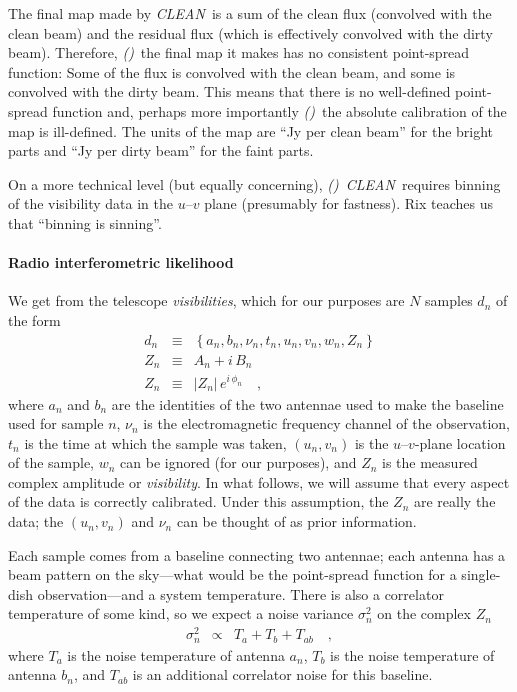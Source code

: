 \documentclass[12pt]{article}
\newcounter{hogg}
\newcommand{\hoggitem}{\textsl{(\thehogg)}\stepcounter{hogg}}
\newcommand{\project}[1]{\textsl{#1}}
\newcommand{\CLEAN}{\project{CLEAN}}
\renewcommand{\exp}[1]{e^{#1}}
\newcommand{\set}[1]{\left\{{#1}\right\}}
\begin{document}
The final map made by \CLEAN\ is a sum of the clean flux (convolved
with the clean beam) and the residual flux (which is effectively
convolved with the dirty beam).  Therefore, \hoggitem~the final map it
makes has no consistent point-spread function: Some of the flux is
convolved with the clean beam, and some is convolved with the dirty
beam.  This means that there is no well-defined point-spread function
and, perhaps more importantly \hoggitem~the absolute calibration of
the map is ill-defined.  The units of the map are ``Jy per clean
beam'' for the bright parts and ``Jy per dirty beam'' for the faint
parts.

On a more technical level (but equally concerning), \hoggitem~\CLEAN\ 
requires binning of the visibility data in the $u$--$v$ plane
(presumably for fastness).  Rix teaches us that ``binning is
sinning''.

\paragraph{Radio interferometric likelihood}

We get from the telescope \emph{visibilities}, which for our purposes
are $N$ samples $d_n$ of the form
\begin{eqnarray}
d_n &\equiv& \set{a_n, b_n, \nu_n, t_n, u_n, v_n, w_n, Z_n}
\\
Z_n &\equiv& A_n + i\,B_n
\\
Z_n &\equiv& \left|Z_n\right|\,\exp{i\,\phi_n}
\quad,
\end{eqnarray}
where $a_n$ and $b_n$ are the identities of the two antennae used to
make the baseline used for sample $n$, $\nu_n$ is the electromagnetic
frequency channel of the observation, $t_n$ is the time at which the
sample was taken, $(u_n, v_n)$ is the $u$--$v$-plane location of the
sample, $w_n$ can be ignored (for our purposes), and $Z_n$ is the
measured complex amplitude or \emph{visibility}.  In what follows, we
will assume that every aspect of the data is correctly calibrated.
Under this assumption, the $Z_n$ are really the data; the $(u_n,
v_n)$ and $\nu_n$ can be thought of as prior information.

Each sample comes from a baseline connecting two antennae; each
antenna has a beam pattern on the sky---what would be the point-spread
function for a single-dish observation---and a system temperature.
There is also a correlator temperature of some kind, so we expect a
noise variance $\sigma_n^2$ on the complex $Z_n$
\begin{eqnarray}
\sigma_n^2 &\propto& T_a + T_b + T_{ab}
\quad ,
\end{eqnarray}
where $T_a$ is the noise temperature of antenna $a_n$, $T_b$ is the
noise temperature of antenna $b_n$, and $T_{ab}$ is an additional
correlator noise for this baseline.
\end{document}
